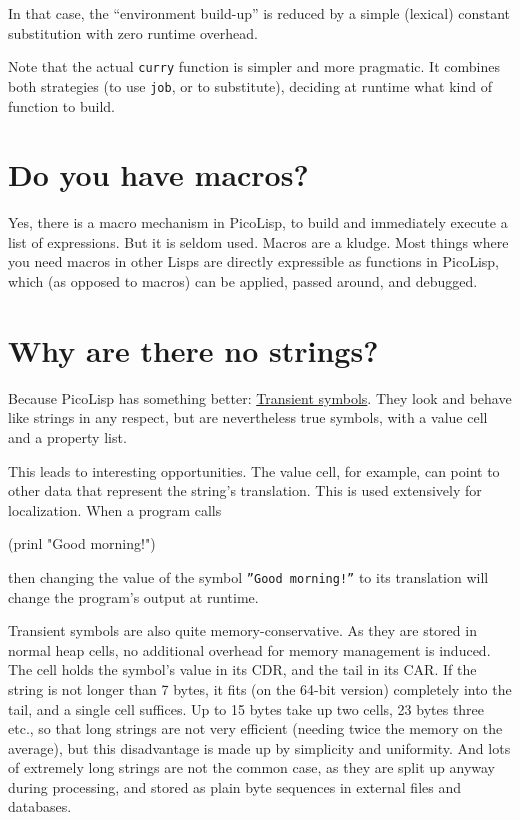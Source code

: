 In that case, the ``environment build-up'' is reduced by a simple
(lexical) constant substitution with zero runtime overhead.

Note that the actual \texttt{curry} function is simpler and more pragmatic. It
combines both strategies (to use \texttt{job}, or to substitute), deciding at
runtime what kind of function to build.

 
\section{Do you have macros?}
\label{sec:faq-do-you-have-macros?}


Yes, there is a macro mechanism in PicoLisp, to build and immediately
execute a list of expressions. But it is seldom used. Macros are a
kludge. Most things where you need macros in other Lisps are directly
expressible as functions in PicoLisp, which (as opposed to macros) can
be applied, passed around, and debugged.

 
\section{Why are there no strings?}
\label{sec:faq-why-are-there-no-strings?}


Because PicoLisp has something better:
\hyperref[ref.html-transient-io]{Transient symbols}. They look and behave like
strings in any respect, but are nevertheless true symbols, with a value
cell and a property list.

This leads to interesting opportunities. The value cell, for example,
can point to other data that represent the string's translation. This is
used extensively for localization. When a program calls


\begin{wideverbatim}
(prinl "Good morning!")
\end{wideverbatim}

then changing the value of the symbol \texttt{''Good morning!''} to its
translation will change the program's output at runtime.

Transient symbols are also quite memory-conservative. As they are stored
in normal heap cells, no additional overhead for memory management is
induced. The cell holds the symbol's value in its CDR, and the tail in
its CAR. If the string is not longer than 7 bytes, it fits (on the
64-bit version) completely into the tail, and a single cell suffices. Up
to 15 bytes take up two cells, 23 bytes three etc., so that long strings
are not very efficient (needing twice the memory on the average), but
this disadvantage is made up by simplicity and uniformity. And lots of
extremely long strings are not the common case, as they are split up
anyway during processing, and stored as plain byte sequences in external
files and databases.

